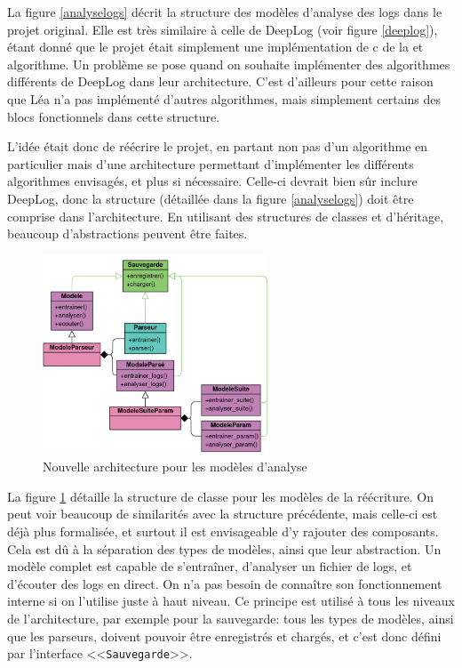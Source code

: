 \documentclass[openany, 11pt]{memoir}
\begin{document}
La figure \ref{analyselogs} décrit la structure des modèles d'analyse des \glspl{log} dans le projet original. Elle est très similaire à celle de DeepLog (voir figure \ref{deeplog}), étant donné que le projet était simplement une implémentation de c de la
et algorithme. Un problème se pose quand on souhaite implémenter des algorithmes différents de DeepLog dans leur architecture. C'est d'ailleurs pour cette raison que Léa n'a pas implémenté d'autres algorithmes, mais simplement certains des blocs fonctionnels dans cette structure.

L'idée était donc de réécrire le projet, en partant non pas d'un algorithme en particulier mais d'une architecture permettant d'implémenter les différents algorithmes envisagés, et plus si nécessaire. Celle-ci devrait bien sûr inclure DeepLog, donc la structure (détaillée dans la figure \ref{analyselogs}) doit être comprise dans l'architecture. En utilisant des structures de classes et d'héritage, beaucoup d'abstractions peuvent être faites.

\begin{figure}[ht]
	\centering
	\includegraphics[width=0.6\textwidth]{images/archireecriture.png}
	\caption{Nouvelle architecture pour les modèles d'analyse}
	\label{archireecriture}
\end{figure}

La figure \ref{archireecriture} détaille la structure de classe pour les modèles de la réécriture. On peut voir beaucoup de similarités avec la structure précédente, mais celle-ci est déjà plus formalisée, et surtout il est envisageable d'y rajouter des composants. Cela est dû à la séparation des types de modèles, ainsi que leur abstraction. Un modèle complet est capable de s'entraîner, d'analyser un fichier de \glspl{log}, et d'écouter des logs en direct. On n'a pas besoin de connaître son fonctionnement interne si on l'utilise juste à haut niveau. Ce principe est utilisé à tous les niveaux de l'architecture, par exemple pour la sauvegarde: tous les types de modèles, ainsi que les parseurs, doivent pouvoir être enregistrés et chargés, et c'est donc défini par l'interface <<\texttt{Sauvegarde}>>.
\end{document}
